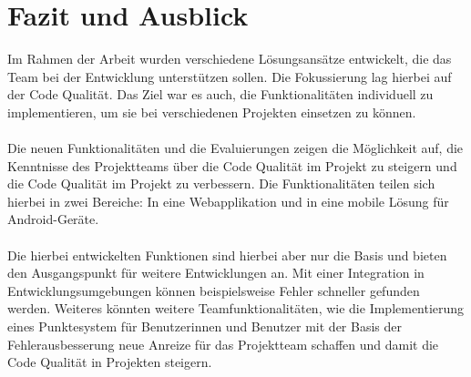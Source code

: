 \chapter{Fazit und Ausblick}
\label{Fazit und Ausblick}
\chapterstart

Im Rahmen der Arbeit wurden verschiedene Lösungsansätze  entwickelt, die das Team bei der Entwicklung unterstützen sollen. Die Fokussierung lag hierbei auf der Code Qualität. Das Ziel war es auch, die Funktionalitäten individuell zu implementieren, um sie bei verschiedenen Projekten einsetzen zu können. \\\\
Die neuen Funktionalitäten und die Evaluierungen zeigen die Möglichkeit auf, die Kenntnisse des Projektteams über die Code Qualität im Projekt zu steigern und die Code Qualität im Projekt zu verbessern. Die Funktionalitäten teilen sich hierbei in zwei Bereiche: In eine Webapplikation und in eine mobile Lösung für Android-Geräte.\\\\
Die hierbei entwickelten Funktionen sind hierbei aber nur die Basis und bieten den Ausgangspunkt für weitere Entwicklungen an. Mit einer Integration in Entwicklungsumgebungen können beispielsweise Fehler schneller gefunden werden. Weiteres könnten weitere Teamfunktionalitäten, wie die Implementierung eines Punktesystem für Benutzerinnen und Benutzer mit der Basis der Fehlerausbesserung neue Anreize für das Projektteam schaffen und damit die Code Qualität in Projekten steigern.
\chapterend



%
